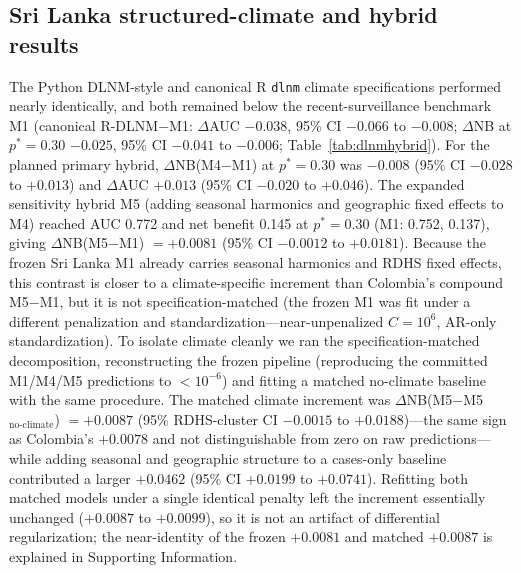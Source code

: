 \documentclass[11pt,a4paper]{article}
\begin{document}
\subsection{Sri Lanka structured-climate and hybrid results}
The Python DLNM-style and canonical R \texttt{dlnm} climate specifications performed nearly identically, and both remained below the recent-surveillance benchmark M1 (canonical R-DLNM$-$M1: $\Delta$AUC $-0.038$, 95\% CI $-0.066$ to $-0.008$; $\Delta$NB at $p^*=0.30$ $-0.025$, 95\% CI $-0.041$ to $-0.006$; Table~\ref{tab:dlnmhybrid}). For the planned primary hybrid, $\Delta$NB(M4$-$M1) at $p^*=0.30$ was $-0.008$ (95\% CI $-0.028$ to $+0.013$) and $\Delta$AUC $+0.013$ (95\% CI $-0.020$ to $+0.046$). The expanded sensitivity hybrid M5 (adding seasonal harmonics and geographic fixed effects to M4) reached AUC 0.772 and net benefit 0.145 at $p^*=0.30$ (M1: 0.752, 0.137), giving $\Delta$NB(M5$-$M1) $=+0.0081$ (95\% CI $-0.0012$ to $+0.0181$). Because the frozen Sri Lanka M1 already carries seasonal harmonics and RDHS fixed effects, this contrast is closer to a climate-specific increment than Colombia's compound M5$-$M1, but it is not specification-matched (the frozen M1 was fit under a different penalization and standardization---near-unpenalized $C{=}10^{6}$, AR-only standardization). To isolate climate cleanly we ran the specification-matched decomposition, reconstructing the frozen pipeline (reproducing the committed M1/M4/M5 predictions to $<10^{-6}$) and fitting a matched no-climate baseline with the same procedure. The matched climate increment was $\Delta$NB(M5$-$M5$_{\text{no-climate}}$) $=+0.0087$ (95\% RDHS-cluster CI $-0.0015$ to $+0.0188$)---the same sign as Colombia's $+0.0078$ and not distinguishable from zero on raw predictions---while adding seasonal and geographic structure to a cases-only baseline contributed a larger $+0.0462$ (95\% CI $+0.0199$ to $+0.0741$). Refitting both matched models under a single identical penalty left the increment essentially unchanged ($+0.0087$ to $+0.0099$), so it is not an artifact of differential regularization; the near-identity of the frozen $+0.0081$ and matched $+0.0087$ is explained in Supporting Information.
\end{document}
